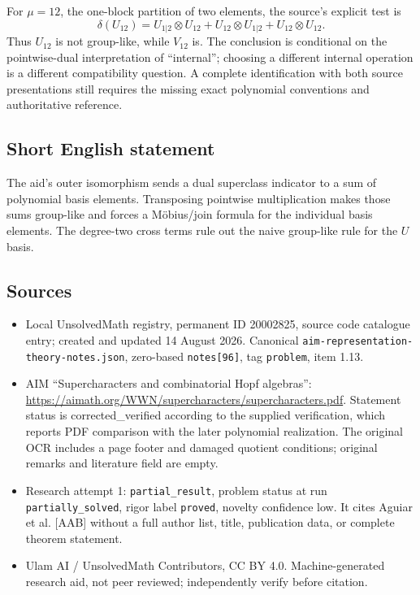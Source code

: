 \documentclass[11pt]{article}
\begin{document}
For $\mu=12$, the one-block partition of two elements, the source's explicit test is
\[
 \delta(U_{12})=U_{1|2}\otimes U_{12}
 +U_{12}\otimes U_{1|2}+U_{12}\otimes U_{12}.
\]
Thus $U_{12}$ is not group-like, while $V_{12}$ is. The conclusion is conditional on the pointwise-dual interpretation of ``internal''; choosing a different internal operation is a different compatibility question. A complete identification with both source presentations still requires the missing exact polynomial conventions and authoritative reference.
\subsection{Short English statement}
The aid's outer isomorphism sends a dual superclass indicator to a sum of polynomial basis elements. Transposing pointwise multiplication makes those sums group-like and forces a Möbius/join formula for the individual basis elements. The degree-two cross terms rule out the naive group-like rule for the $U$ basis.
\subsection{Sources}
\begin{itemize}
\item Local UnsolvedMath registry, permanent ID 20002825, source code catalogue entry; created and updated 14 August 2026. Canonical \texttt{aim-representation-theory-notes.json}, zero-based \texttt{notes[96]}, tag \texttt{problem}, item 1.13.
\item AIM ``Supercharacters and combinatorial Hopf algebras'': \url{https://aimath.org/WWN/supercharacters/supercharacters.pdf}. Statement status is corrected\_verified according to the supplied verification, which reports PDF comparison with the later polynomial realization. The original OCR includes a page footer and damaged quotient conditions; original remarks and literature field are empty.
\item Research attempt 1: \texttt{partial\_result}, problem status at run \texttt{partially\_solved}, rigor label \texttt{proved}, novelty confidence low. It cites Aguiar et al. [AAB] without a full author list, title, publication data, or complete theorem statement.
\item Ulam AI / UnsolvedMath Contributors, CC BY 4.0. Machine-generated research aid, not peer reviewed; independently verify before citation.
\end{itemize}
\end{document}
